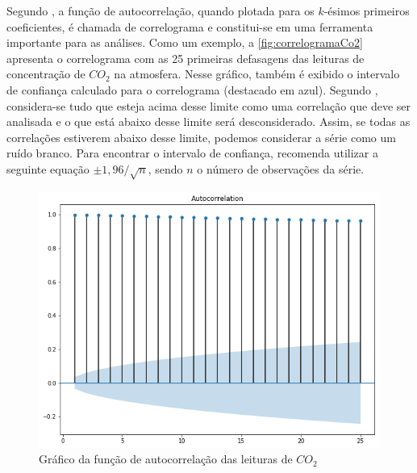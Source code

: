 \documentclass[
    12pt,
    oneside,
    a4paper,
    english,
    brazil
]{abntex2}
\begin{document}
Segundo  , a  função  de autocorrelação,  quando plotada  para os  $k$-ésimos  primeiros  coeficientes,  é chamada  de  correlograma e constitui-se em uma  ferramenta importante  para  as  análises.
Como um exemplo, a \autoref{fig:correlogramaCo2} apresenta o correlograma com as 25 primeiras defasagens das leituras  de concentração de $CO_2$ na  atmosfera. Nesse gráfico, também é exibido o intervalo de confiança calculado para o correlograma (destacado em azul). Segundo , %
considera-se tudo que esteja acima desse limite como uma correlação que deve ser analisada e o que está abaixo desse limite será desconsiderado. Assim, se todas as correlações estiverem abaixo desse limite, podemos considerar a série como um  ruído branco. 
Para encontrar o intervalo de confiança,  recomenda utilizar a seguinte equação  $\pm{}1,96/\sqrt{n}$, sendo $n$ o número de observações da série.



\begin{figure}
    \centering
    \caption{Gráfico da função de autocorrelação das leituras de
        $CO_2$}\label{fig:correlogramaCo2}
    \includegraphics[width=.6\linewidth]{images/acf_co2.png}
\end{figure}
\end{document}
